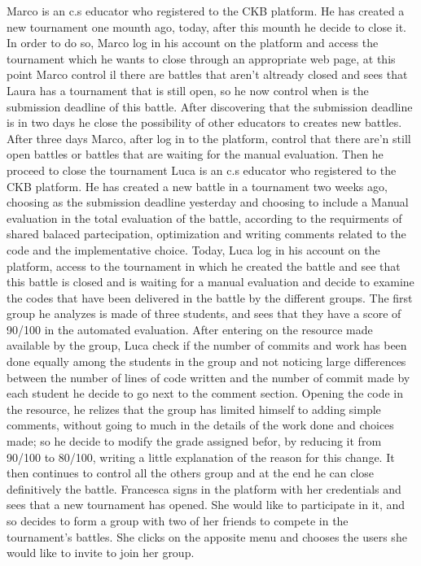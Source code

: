 \documentclass{article}
\newcounter{subsubsubsection}[subsubsection]
\begin{document}
{Marco is an c.s educator who registered to the CKB platform. He has created a new tournament one mounth ago, today, after this mounth he decide to close it. In order to do so, Marco log in his account on the platform and access the tournament which he wants to close through an appropriate web page, at this point Marco control il there are battles that aren't altready closed and sees that Laura has a tournament that is still open, so he now control when is the submission deadline of this battle. After discovering that the submission deadline is in two days he close the possibility of other educators to creates new battles.
After three days Marco, after log in to the platform, control that there are'n still open battles or battles that are waiting for the manual evaluation. Then he proceed to close the tournament
Luca is an c.s educator who registered to the CKB platform. He has created a new battle in a tournament two weeks ago, choosing as the submission deadline yesterday and choosing to include a Manual evaluation in the total evaluation of the battle, according to the requirments of shared balaced partecipation, optimization and writing comments related to the code and the implementative choice.
Today, Luca log in his account on the platform, access to the tournament in which he created the battle and see that this battle is closed and is waiting for a manual evaluation and decide to examine the codes that have been delivered in the battle by the different groups.
The first group he analyzes is made of three students, and sees that they have a score of 90/100 in the automated evaluation. After entering on the resource made available by the group, Luca check if the number of commits and work has been done equally among the students in the group and not noticing large differences between the number of lines of code written and the number of commit made by each student he decide to go next to the comment section.
Opening the code in the resource, he relizes that the group has limited himself to adding simple comments, without going to much in the details of the work done and choices made; so he decide to modify the grade assigned befor, by reducing it from 90/100 to 80/100, writing a little explanation of the reason for this change. It then continues to control all the others group and at the end he can close definitively the battle.
Francesca signs in the platform with her credentials and sees that a new tournament has opened. She would like to participate in it, and so decides to form a group with two of her friends to compete in the tournament's battles. She clicks on the apposite menu and chooses the users she would like to invite to join her group.
}
\end{document}
